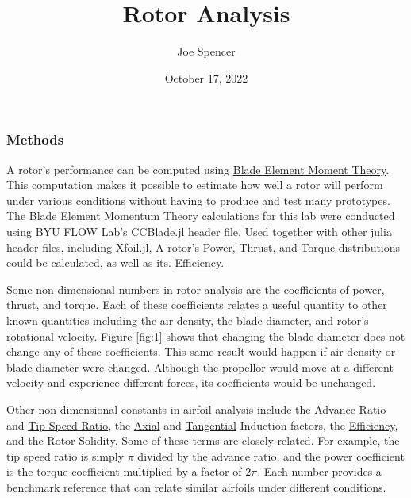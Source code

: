 \documentclass{article}
\begin{document}
\author{Joe Spencer}
\title{Rotor Analysis}
\date{October 17, 2022}
\maketitle

\subsubsection*{Methods}

A rotor's performance can be computed using  \hyperlink{BEM}{Blade Element Moment Theory}. This computation makes it possible to estimate how well a rotor will perform under various conditions without having to produce and test many prototypes. The Blade Element Momentum Theory calculations for this lab were conducted using BYU FLOW Lab's \href{https://flow.byu.edu/CCBlade.jl/stable/}{CCBlade.jl} header file. Used together with other julia header files, including \href{https://flow.byu.edu/Xfoil.jl/dev/}{Xfoil.jl}, A rotor's \hyperlink{CP}{Power}, \hyperlink{CT}{Thrust}, and \hyperlink{CQ}{Torque} distributions could be calculated, as well as its. \hyperlink{eta}{Efficiency}. \newline

Some non-dimensional numbers in rotor analysis are the coefficients of power, thrust, and torque. Each of these coefficients relates a useful quantity to other known quantities including the air density, the blade diameter, and rotor's rotational velocity. Figure \ref{fig:1} shows that changing the blade diameter does not change any of these coefficients. This same result would happen if air density or blade diameter were changed. Although the propellor would move at a different velocity and experience different forces, its coefficients would be unchanged. \newline

Other non-dimensional constants in airfoil analysis include the \hyperlink{J}{Advance Ratio} and \hyperlink{lambda}{Tip Speed Ratio}, the \hyperlink{a}{Axial} and \hyperlink{a'}{Tangential} Induction factors, the \hyperlink{eta}{Efficiency}, and the \hyperlink{sigma}{Rotor Solidity}. Some of these terms are closely related. For example, the tip speed ratio is simply $\pi$ divided by the advance ratio, and the power coefficient is the torque coefficient multiplied by a factor of $2 \pi$. Each number provides a benchmark reference that can relate similar airfoils under different conditions. \newline 
\end{document}
